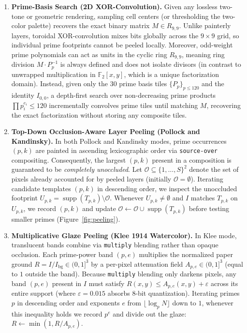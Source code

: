 \documentclass[]{interact}
\theoremstyle{plain}
\theoremstyle{definition}
\theoremstyle{remark}
\begin{document}
\begin{enumerate}
  \item \textbf{Prime-Basis Search (2D XOR-Convolution).}
  Given any lossless two-tone or geometric rendering, sampling cell centers (or thresholding the two-color palette) recovers the exact binary matrix $M \in R_{9,9}$. Unlike painterly layers, toroidal XOR-convolution mixes bits globally across the $9 \times 9$ grid, so individual prime footprints cannot be peeled locally. Moreover, odd-weight prime polynomials can act as units in the cyclic ring $R_{9,9}$, meaning ring division $M \cdot P_p^{-1}$ is always defined and does not isolate divisors (in contrast to unwrapped multiplication in $\mathbb{F}_2[x,y]$, which is a unique factorization domain). Instead, given only the $30$ prime basis tiles $\{P_p\}_{p \le 120}$ and the identity $I_{0,0}$, a depth-first search over non-decreasing prime products $\prod p_i^{e_i} \le 120$ incrementally convolves prime tiles until matching $M$, recovering the exact factorization without storing any composite tiles.

  \item \textbf{Top-Down Occlusion-Aware Layer Peeling (Pollock and Kandinsky).}
  In both Pollock and Kandinsky modes, prime occurrences $(p, k)$ are painted in ascending lexicographic order via \texttt{source-over} compositing. Consequently, the largest $(p, k)$ present in a composition is guaranteed to be \emph{completely unoccluded}. Let $\mathcal{O} \subseteq \{1,\dots,S\}^2$ denote the set of pixels already accounted for by peeled layers (initially $\mathcal{O} = \emptyset$). Iterating candidate templates $(p, k)$ in descending order, we inspect the unoccluded footprint $U_{p,k} = \operatorname{supp}(T_{p,k}) \setminus \mathcal{O}$. Whenever $U_{p,k} \neq \emptyset$ and $I$ matches $T_{p,k}$ on $U_{p,k}$, we record $(p, k)$ and update $\mathcal{O} \leftarrow \mathcal{O} \cup \operatorname{supp}(T_{p,k})$ before testing smaller primes (Figure~\ref{fig:peeling}).

  \item \textbf{Multiplicative Glaze Peeling (Klee 1914 Watercolor).}
  In Klee mode, translucent bands combine via \texttt{multiply} blending rather than opaque occlusion. Each prime-power band $(p, e)$ multiplies the normalized paper ground $R = I / I_{\mathrm{bg}} \in (0, 1]^3$ by a per-pixel attenuation field $A_{p,e} \in (0, 1]^3$ (equal to $1$ outside the band). Because \texttt{multiply} blending only darkens pixels, any band $(p, e)$ present in $I$ must satisfy $R(x,y) \le A_{p,e}(x,y) + \varepsilon$ across its entire support (where $\varepsilon = 0.015$ absorbs 8-bit quantization). Iterating primes $p$ in descending order and exponents $e$ from $\lfloor \log_p N \rfloor$ down to $1$, whenever this inequality holds we record $p^e$ and divide out the glaze: $R \leftarrow \min(1, R / A_{p,e})$.
\end{enumerate}
\end{document}
